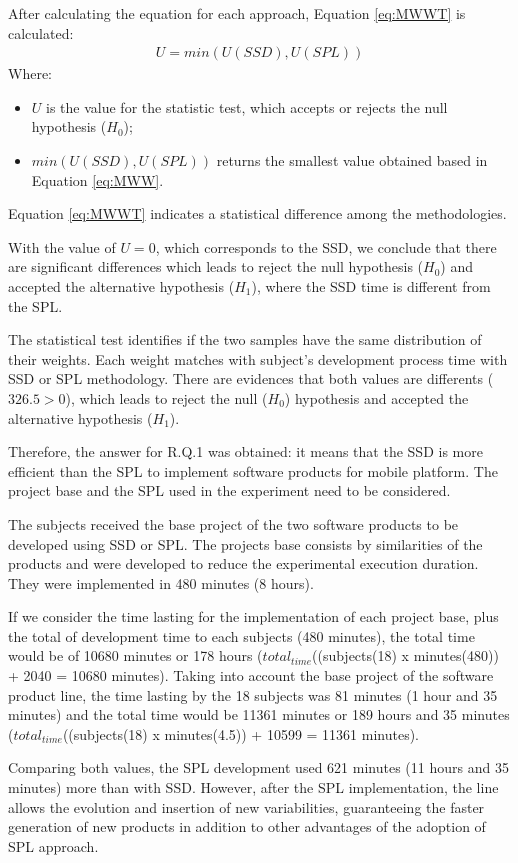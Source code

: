 \begin{itemize}
After calculating the equation for each approach, Equation \ref{eq:MWWT} is calculated:
\small
\begin{equation}
\begin{split}
\label{eq:MWWT}
U = min(U(SSD),U(SPL))
\end{split}
\end{equation}
\normalsize 
Where:
\begin{itemize}
\item \textit{$U$} is the value for the statistic test, which accepts or rejects the null hypothesis ($H_0$);
\item \textit{$min(U(SSD),U(SPL))$} returns the smallest value obtained based in Equation \ref{eq:MWW}.
\end{itemize}

Equation \ref{eq:MWWT} indicates a statistical difference among the methodologies.

With the value of $U=0$, which corresponds to the SSD, we conclude that there are significant differences which leads to reject the null hypothesis ($H_0$) and accepted the alternative hypothesis ($H_{1}$), where the SSD time is different from the SPL.


The statistical test identifies if the two samples have the same distribution of their weights. Each weight matches with subject's development process time with SSD or SPL methodology. There are evidences that both values are differents ($326.5>0$), which leads to reject the null ($H_0$) hypothesis and accepted the alternative hypothesis ($H_{1}$).

Therefore, the answer for R.Q.1 was obtained: it means that the SSD is more efficient than the SPL to implement software products for mobile platform. The project base and the SPL used in the experiment need to be considered.


The subjects received the base project of the two software products to be developed using SSD or SPL. The projects base consists by similarities of the products and were developed to reduce the experimental execution duration. They were implemented in 480 minutes (8 hours).

If we consider the time lasting for the implementation of each project base, plus the total of development time to each subjects (480 minutes), the total time would be of 10680 minutes or 178 hours ($total_{time}$((subje\allowbreak cts(18) x minutes(480)) + 2040 = 10680 minutes). Taking into account the base project of the software product line, the time lasting by the 18 subjects was 81 minutes (1 hour and 35 minutes) and the total time would be 11361 minutes or 189 hours and 35 minutes ($total_{time}$((subjects(18) x minutes(4.5)) + 10599 = 11361 minutes). 

Comparing both values, the SPL development used 621 minutes (11 hours and 35 minutes) more than with SSD. However, after the SPL implementation, the line allows the evolution and insertion of new variabilities, guaranteeing the faster generation of new products in addition to other advantages of the adoption of SPL approach.



\end{itemize}




